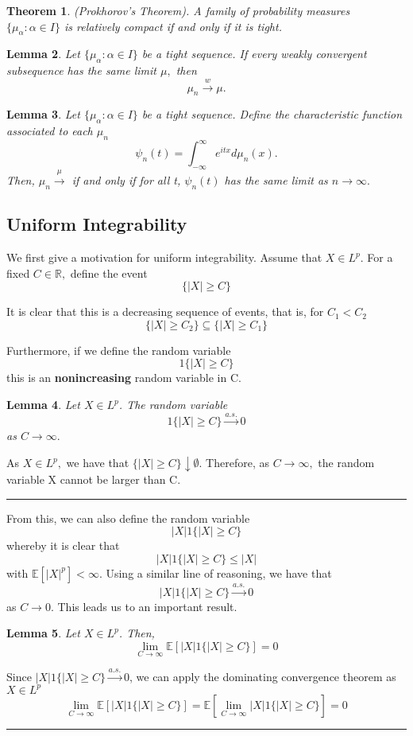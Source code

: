 \documentclass[twoside]{article}
\newcounter{lecnum}
\newtheorem{theorem}{Theorem}[lecnum]
\newtheorem{lemma}[theorem]{Lemma}
\newenvironment{proof}{{\bf Proof:}}{\hfill\rule{2mm}{2mm}}
\begin{document}
\begin{theorem}(Prokhorov's Theorem). A family of probability measures $\{\mu_{\alpha}: \alpha \in I\}$ is relatively compact if and only if it is tight.
\end{theorem}

\begin{lemma} Let $\{\mu_{\alpha}: \alpha \in I\}$ be a tight sequence. If every weakly convergent subsequence has the same limit $\mu,$ then 
$$
\mu_n \xrightarrow{w} \mu.
$$
\end{lemma}

\begin{lemma}
Let $\{\mu_{\alpha}: \alpha \in I\}$ be a tight sequence. Define the characteristic function associated to each $\mu_{n}$
$$
\psi_n(t) = \int_{-\infty}^{\infty}e^{itx}d\mu_n(x).
$$
Then, $\mu_n \xrightarrow \mu$ if and only if for all t, $\psi_n(t)$ has the same limit as $n \rightarrow \infty.$
\end{lemma}

\subsection{Uniform Integrability}

We first give a motivation for uniform integrability. Assume that $X \in L^p.$ For a fixed $C \in \mathbb{R},$ define the event
$$
\{|X| \geq C\}
$$

It is clear that this is a decreasing sequence of events, that is, for $C_1 < C_2$
$$
\{|X| \geq C_2\} \subseteq \{|X| \geq C_1\}
$$

Furthermore, if we define the random variable 
$$
1\{|X| \geq C\}
$$
this is an \textbf{nonincreasing} random variable in C. 

\begin{lemma} Let $X \in L^p$. The random variable 
$$
1\{|X| \geq C\} \xrightarrow{a.s.} 0
$$
as $C \rightarrow \infty.$
\end{lemma}
\begin{proof}
As $X \in L^p,$ we have that $\{|X| \geq C\} \downarrow \emptyset.$ Therefore, as $C \rightarrow \infty,$ the random variable X cannot be larger than C.
\end{proof}

From this, we can also define the random variable 
$$
|X|1\{|X| \geq C\}
$$
whereby it is clear that 
$$
|X|1\{|X| \geq C\} \leq |X| 
$$
with $\mathbb{E}[|X|^p] < \infty.$ Using a similar line of reasoning, we have that 
$$
|X|1\{|X| \geq C\} \xrightarrow{a.s.} 0
$$
as $C \rightarrow 0.$ This leads us to an important result.
\begin{lemma} Let $X \in L^p$. Then,
$$
\lim_{C \rightarrow \infty}\mathbb{E}[|X|1\{|X| \geq C\}] = 0
$$
\end{lemma}
\begin{proof}
Since $|X|1\{|X| \geq C\} \xrightarrow{a.s.} 0$, we can apply the dominating convergence theorem as $X \in L^p$
$$
\lim_{C \rightarrow \infty}\mathbb{E}[|X|1\{|X| \geq C\}] = \mathbb{E}[\lim_{C \rightarrow \infty}|X|1\{|X| \geq C\}] = 0
$$
\end{proof}
\end{document}
